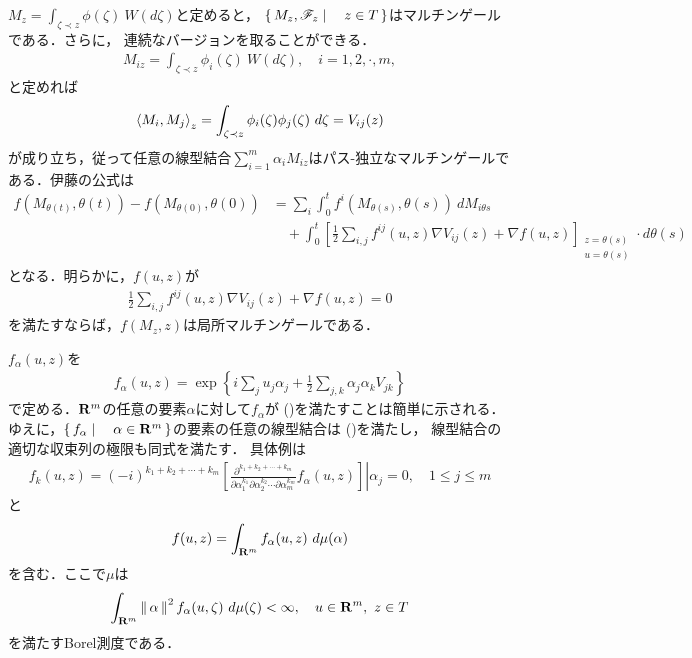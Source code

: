 	$M_{z} = \int_{\zeta \prec z} \phi(\zeta)\ W(d\zeta)$と定めると，
	$\left\{\, M_{z},\mathscr{F}_{z} \mid \quad z \in T\, \right\}$はマルチンゲールである．さらに，
	連続なバージョンを取ることができる．
	\begin{align}
		M_{iz} = \int_{\zeta \prec z} \phi_{i}(\zeta)\ W(d\zeta),
		\quad i = 1,2,\cdot,m,
	\end{align}
	と定めれば
	\begin{align}
		\inprod<M_{i},M_{j}>_{z} = 
		\int_{\zeta \prec z} \phi_{i}(\zeta) \phi_{j}(\zeta)\ d\zeta = V_{ij}(z)
	\end{align}
	が成り立ち，従って任意の線型結合$\sum_{i=1}^{m} \alpha_{i} M_{iz}$はパス-独立なマルチンゲールである．伊藤の公式は
	\begin{align}
		f\left(M_{\theta(t)},\theta(t)\right) - f\left(M_{\theta(0)},\theta(0)\right)
		&= \sum_{i} \int_{0}^{t} f^{i}\left(M_{\theta(s)},\theta(s)\right)\ dM_{i\theta{s}} \\
		&\quad + \int_{0}^{t} \left[\frac{1}{2} \sum_{i,j} f^{ij}(u,z) \nabla V_{ij}(z)
		+ \nabla f(u,z)\right]_{\substack{z=\theta(s) \\ u=\theta(s)}} \cdot d\theta(s)
		\label{fom:Wiener_Integral_and_Hermite_Functionals_3}
	\end{align}
	となる．明らかに，$f(u,z)$が
	\begin{align}
		\frac{1}{2} \sum_{i,j} f^{ij}(u,z) \nabla V_{ij}(z) + \nabla f(u,z) = 0
		\label{fom:Wiener_Integral_and_Hermite_Functionals_1}
	\end{align}
	を満たすならば，$f(M_{z},z)$は局所マルチンゲールである．
	
	$f_{\alpha}(u,z)$を
	\begin{align}
		f_{\alpha}(u,z) = \exp{\left\{i \sum_{j}u_{j}\alpha_{j} 
		+ \frac{1}{2} \sum_{j,k}\alpha_{j}\alpha_{k}V_{jk}\right\}}
	\end{align}
	で定める．$\mathbf{R}^{m}$の任意の要素$\alpha$に対して$f_{\alpha}$が
	()を満たすことは簡単に示される．
	ゆえに，$\left\{\, f_{\alpha} \mid \quad \alpha \in \mathbf{R}^{m}\, \right\}$の要素の任意の線型結合は
	()を満たし，
	線型結合の適切な収束列の極限も同式を満たす．
	具体例は
	\begin{align}
		f_{k}(u,z)
		= (-i)^{k_{1}+k_{2}+\cdots+k_{m}}\left.\left[
		\frac{\partial^{k_{1}+k_{2}+\cdots+k_{m}}}{\partial \alpha_{1}^{k_{1}}
		\partial \alpha_{2}^{k_{2}}\cdots\partial \alpha_{m}^{k_{m}}}f_{\alpha}(u,z)\right] \right| \alpha_{j} = 0,
		\quad 1 \leq j \leq m
		\label{fom:Wiener_Integral_and_Hermite_Functionals_2}
	\end{align}
	と
	\begin{align}
		f(u,z) = \int_{\mathbf{R}^{m}} f_{\alpha}(u,z)\ d\mu(\alpha)
	\end{align}
	を含む．ここで$\mu$は
	\begin{align}
		\int_{\R^{m}} \Norm{\alpha}{}^{2} f_{\alpha}(u,\zeta)\ d\mu(\zeta) < \infty,
		\quad u \in \R^{m},\ z \in T
	\end{align}
	を満たすBorel測度である．
	
